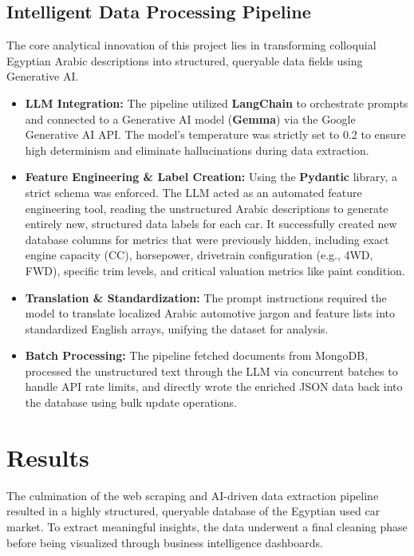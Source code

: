 \documentclass[12pt]{article}
\begin{document}
\subsection{Intelligent Data Processing Pipeline}
The core analytical innovation of this project lies in transforming colloquial Egyptian Arabic descriptions into structured, queryable data fields using Generative AI.
\begin{itemize}
    \item \textbf{LLM Integration:} The pipeline utilized \textbf{LangChain} to orchestrate prompts and connected to a Generative AI model (\textbf{Gemma}) via the Google Generative AI API. The model's temperature was strictly set to 0.2 to ensure high determinism and eliminate hallucinations during data extraction.
    \item \textbf{Feature Engineering \& Label Creation:} Using the \textbf{Pydantic} library, a strict schema was enforced. The LLM acted as an automated feature engineering tool, reading the unstructured Arabic descriptions to generate entirely new, structured data labels for each car. It successfully created new database columns for metrics that were previously hidden, including exact engine capacity (CC), horsepower, drivetrain configuration (e.g., 4WD, FWD), specific trim levels, and critical valuation metrics like paint condition.
    \item \textbf{Translation \& Standardization:} The prompt instructions required the model to translate localized Arabic automotive jargon and feature lists into standardized English arrays, unifying the dataset for analysis.
    \item \textbf{Batch Processing:} The pipeline fetched documents from MongoDB, processed the unstructured text through the LLM via concurrent batches to handle API rate limits, and directly wrote the enriched JSON data back into the database using bulk update operations.
\end{itemize}

\newpage
\section{Results}

The culmination of the web scraping and AI-driven data extraction pipeline resulted in a highly structured, queryable database of the Egyptian used car market. To extract meaningful insights, the data underwent a final cleaning phase before being visualized through business intelligence dashboards.
\end{document}
